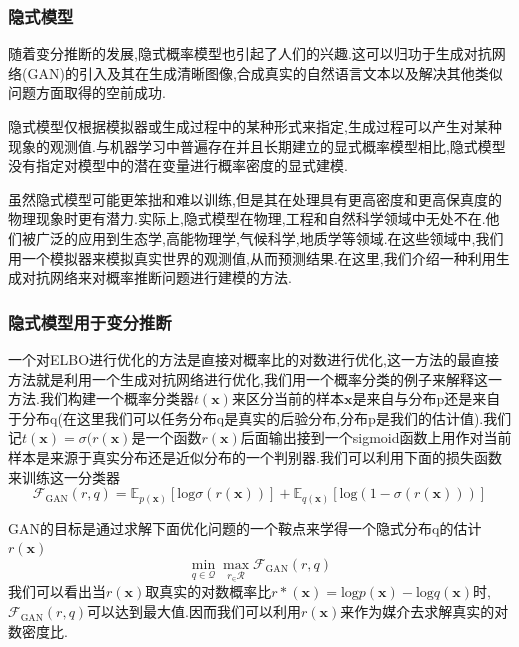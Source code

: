 \documentclass{ctexart}
\begin{document}
\subsubsection{隐式模型}
随着变分推断的发展,隐式概率模型也引起了人们的兴趣.这可以归功于生成对抗网络(GAN)的引入及其在生成清晰图像,合成真实的自然语言文本以及解决其他类似问题方面取得的空前成功.


隐式模型仅根据模拟器或生成过程中的某种形式来指定,生成过程可以产生对某种现象的观测值.与机器学习中普遍存在并且长期建立的显式概率模型相比,隐式模型没有指定对模型中的潜在变量进行概率密度的显式建模.


虽然隐式模型可能更笨拙和难以训练,但是其在处理具有更高密度和更高保真度的物理现象时更有潜力.实际上,隐式模型在物理,工程和自然科学领域中无处不在.他们被广泛的应用到生态学,高能物理学,气候科学,地质学等领域.在这些领域中,我们用一个模拟器来模拟真实世界的观测值,从而预测结果.在这里,我们介绍一种利用生成对抗网络来对概率推断问题进行建模的方法.
\subsubsection{隐式模型用于变分推断}
一个对ELBO进行优化的方法是直接对概率比的对数进行优化,这一方法的最直接方法就是利用一个生成对抗网络进行优化,我们用一个概率分类的例子来解释这一方法.我们构建一个概率分类器$t(\mathbf{x})$来区分当前的样本$\mathbf{x}$是来自与分布p还是来自于分布q(在这里我们可以任务分布q是真实的后验分布,分布p是我们的估计值).我们记$t(\mathbf{x}) = \sigma(r(\mathbf{x})$是一个函数$r(\mathbf{x})$后面输出接到一个sigmoid函数上用作对当前样本是来源于真实分布还是近似分布的一个判别器.我们可以利用下面的损失函数来训练这一分类器
\begin{equation*}
	\mathcal{F}_{\text{GAN}}(r,q) = \mathbb{E}_{p(\mathbf{x})}[\text{log}\sigma(r(\mathbf{x}))]+\mathbb{E}_{q(\mathbf{x})}[\text{log}(1-\sigma(r(\mathbf{x})))]
\end{equation*}


GAN的目标是通过求解下面优化问题的一个鞍点来学得一个隐式分布q的估计$r(\mathbf{x})$
\begin{equation*}
	\min_{q\in \mathcal{Q}}\max_{r_\in\mathcal{R}}\mathcal{F}_{\text{GAN}}(r,q)
\end{equation*}
我们可以看出当$r(\mathbf{x})$取真实的对数概率比$r*(\mathbf{x}) = \text{log}p(\mathbf{x})-\text{log}q(\mathbf{x})$时,$\mathcal{F}_{\text{GAN}}(r,q)$可以达到最大值.因而我们可以利用$r(\mathbf{x})$来作为媒介去求解真实的对数密度比.\cite{mohamed2016learning}


\end{document}
